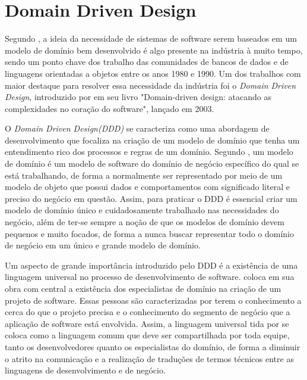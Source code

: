 \documentclass[12pt, %
openright, 
oneside, %
a4paper,    %
brazil]{facom-ufu-abntex2}
\begin{document}
\section{Domain Driven Design}
Segundo , a ideia da necessidade de sistemas de software serem baseados em um modelo de domínio bem desenvolvido é algo presente na indústria à muito tempo, sendo um ponto chave dos trabalho das comunidades de bancos de dados e de linguagens orientadas a objetos entre os anos 1980 e 1990. Um dos trabalhos com maior destaque para resolver essa necessidade da indústria foi o \textit{Domain Driven Design}, introduzido por  em seu livro "Domain-driven design: atacando as complexidades no coração do software", lançado em 2003.

O \textit{Domain Driven Design(DDD)} se caracteriza como uma abordagem de desenvolvimento que focaliza na criação de um modelo de domínio que tenha um entendimento rico dos processos e regras de um domínio. Segundo , um modelo de domínio é um modelo de software do domínio de negócio específico do qual se está trabalhando, de forma a normalmente ser representado por meio de um modelo de objeto que possui dados e comportamentos com significado literal e preciso do negócio em questão. Assim, para praticar o DDD é essencial criar um modelo de domínio único e cuidadosamente trabalhado nas necessidades do negócio, além de ter-se sempre a noção de que os modelos de domínio devem pequenos e muito focados, de forma a nunca buscar representar todo o domínio de negócio em um único e grande modelo de domínio.

Um aspecto de grande importância introduzido pelo DDD é a existência de uma linguagem universal no processo de desenvolvimento de software.  coloca em sua obra com central a existência dos especialistas de domínio na criação de um projeto de software. Essas pessoas são caracterizadas por terem o conhecimento a cerca do que o projeto precisa e o conhecimento do segmento de negócio que a aplicação de software está envolvida. Assim, a linguagem universal tida por  se coloca como a linguagem comum que deve ser compartilhada por toda equipe, tanto os desenvolvedores quanto os especialistas do domínio, de forma a diminuir o atrito na comunicação e a realização de traduções de termos técnicos entre as linguagens de desenvolvimento e de negócio.
\end{document}
